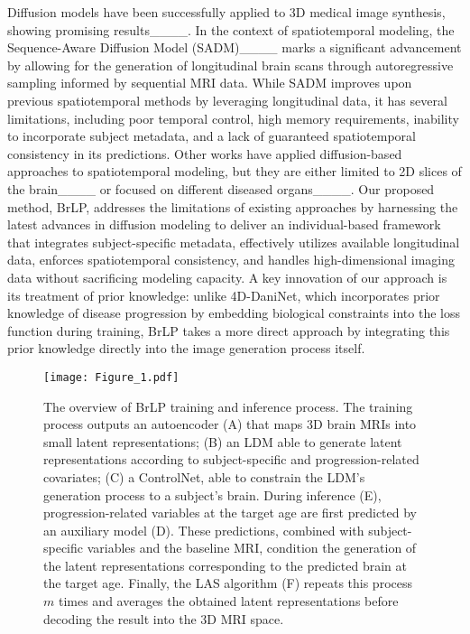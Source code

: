Diffusion models have been successfully applied to 3D medical image synthesis, showing promising results____. In the context of spatiotemporal modeling, the Sequence-Aware Diffusion Model (SADM)____ marks a significant advancement by allowing for the generation of longitudinal brain scans through autoregressive sampling informed by sequential MRI data. While SADM improves upon previous spatiotemporal methods by leveraging longitudinal data, it has several limitations, including poor temporal control, high memory requirements, inability to incorporate subject metadata, and a lack of guaranteed spatiotemporal consistency in its predictions. Other works have applied diffusion-based approaches to spatiotemporal modeling, but they are either limited to 2D slices of the brain____ or focused on different diseased organs____. Our proposed method, BrLP, addresses the limitations of existing approaches by harnessing the latest advances in diffusion modeling to deliver an individual-based framework that integrates subject-specific metadata, effectively utilizes available longitudinal data, enforces spatiotemporal consistency, and handles high-dimensional imaging data without sacrificing modeling capacity. A key innovation of our approach is its treatment of prior knowledge: unlike 4D-DaniNet, which incorporates prior knowledge of disease progression by embedding biological constraints into the loss function during training, BrLP takes a more direct approach by integrating this prior knowledge directly into the image generation process itself.


\begin{figure*}[t!]
    \centering
    \texttt{[image: Figure\_1.pdf]}
    \caption{The overview of BrLP training and inference process. The training process outputs an autoencoder (A) that maps 3D brain MRIs into small latent representations; (B) an LDM able to generate latent representations according to subject-specific and progression-related covariates; (C) a ControlNet, able to constrain the LDM’s generation process to a subject’s brain. During inference (E), progression-related variables at the target age are first predicted by an auxiliary model (D). These predictions, combined with subject-specific variables and the baseline MRI, condition the generation of the latent representations corresponding to the predicted brain at the target age. Finally, the LAS algorithm (F) repeats this process $m$ times and averages the obtained latent representations before decoding the result into the 3D MRI space.}
    \label{fig:pipeline}
\end{figure*}